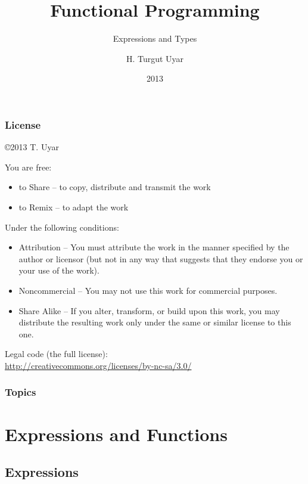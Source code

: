 \documentclass[dvipsnames]{beamer}
\title{Functional Programming}
\subtitle{Expressions and Types}
\author{H. Turgut Uyar}
\date{2013}
\theoremstyle{plain}
\begin{document}
\begin{frame}
  \titlepage
\end{frame}

\begin{frame}
  \frametitle{License}

  \hfill
  \copyright 2013 T. Uyar

  \vfill
  \begin{tiny}
    You are free:
    \begin{itemize}
      \item to Share -- to copy, distribute and transmit the work
      \item to Remix -- to adapt the work
    \end{itemize}

    Under the following conditions:
    \begin{itemize}
      \item Attribution -- You must attribute the work in the manner specified by
        the author or licensor (but not in any way that suggests that they
        endorse you or your use of the work).

      \item Noncommercial -- You may not use this work for commercial purposes.

      \item Share Alike -- If you alter, transform, or build upon this work, you
        may distribute the resulting work only under the same or similar license
        to this one.
    \end{itemize}
  \end{tiny}

  \vfill
  Legal code (the full license):\\
  \url{http://creativecommons.org/licenses/by-nc-sa/3.0/}
\end{frame}

\begin{frame}
  \frametitle{Topics}
  \tableofcontents
\end{frame}

\section{Expressions and Functions}

\subsection{Expressions}
\end{document}
